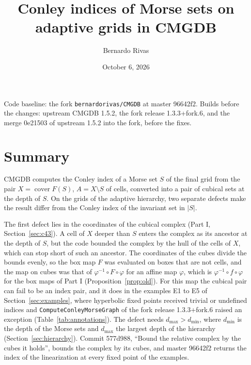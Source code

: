 \documentclass[11pt]{article}
\title{Conley indices of Morse sets on adaptive grids in CMGDB}
\author{Bernardo Rivas}
\date{October 6, 2026}
\theoremstyle{plain}
\theoremstyle{definition}
\theoremstyle{remark}
\DeclareMathOperator{\cover}{cover}
\newcommand{\dmin}{d_{\min}}
\newcommand{\dmax}{d_{\max}}
\newcommand{\code}[1]{\texttt{#1}}
\begin{document}
\maketitle

\begin{center}
\small Code baseline: the fork \code{bernardorivas/CMGDB} at master 96642f2. Builds before the changes: upstream CMGDB 1.5.2, the fork release 1.3.3+fork.6, and the merge 0e21503 of upstream 1.5.2 into the fork, before the fixes.
\end{center}

\section{Summary}\label{sec:summary}

CMGDB computes the Conley index of a Morse set $S$ of the final grid from the pair $X=\cover F(S)$, $A=X\setminus S$ of cells, converted into a pair of cubical sets at the depth of $S$. On the grids of the adaptive hierarchy, two separate defects make the result differ from the Conley index of the invariant set in $|S|$.

The first defect lies in the coordinates of the cubical complex (Part I, Section~\ref{sec:c43}). A cell of $X$ deeper than $S$ enters the complex as its ancestor at the depth of $S$, but the code bounded the complex by the hull of the cells of $X$, which can stop short of such an ancestor. The coordinates of the cubes divide the bounds evenly, so the box map $F$ was evaluated on boxes that are not cells, and the map on cubes was that of $\varphi^{-1}\circ F\circ\varphi$ for an affine map $\varphi$, which is $\varphi^{-1}\circ f\circ\varphi$ for the box maps of Part I (Proposition~\ref{prop:old}). For this map the cubical pair can fail to be an index pair, and it does in the examples E1 to E5 of Section~\ref{sec:examples}, where hyperbolic fixed points received trivial or undefined indices and \code{ComputeConleyMorseGraph} of the fork release 1.3.3+fork.6 raised an exception (Table~\ref{tab:annotations}). The defect needs $\dmax>\dmin$, where $\dmin$ is the depth of the Morse sets and $\dmax$ the largest depth of the hierarchy (Section~\ref{sec:hierarchy}). Commit 577d988, ``Bound the relative complex by the cubes it holds'', bounds the complex by its cubes, and master 96642f2 returns the index of the linearization at every fixed point of the examples.
\end{document}
